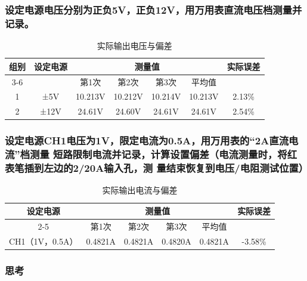 \documentclass[10.5pt]{config}
\begin{document}
\subsubsection{设定电源电压分别为正负5V，正负12V，用万用表直流电压档测量并记录。}
\begin{table}[htbp]
  \centering
  \caption{实际输出电压与偏差}
    \begin{tabular}{|c|c|c|c|c|c|c|}
    \hline
    \multirow{2}[4]{*}{组别} & \multirow{2}[4]{*}{设定电源} & \multicolumn{4}{c|}{测量值} & \multirow{2}[4]{*}{实际误差} \bigstrut\\
\cline{3-6}          &       & 第1次   & 第2次   & 第3次   & 平均值   &  \bigstrut\\
    \hline
    1     & ±5V   & 10.213V & 10.212V & 10.214V & 10.213V & 2.13\% \bigstrut\\
    \hline
    2     & ±12V  & 24.61V & 24.60V & 24.61V & 24.61V & 2.54\% \bigstrut\\
    \hline
    \end{tabular}%
  \label{tab:addlabel}%
\end{table}%

\subsubsection{设定电源CH1电压为1V，限定电流为0.5A，用万用表的“2A直流电流”档测量
短路限制电流并记录，计算设置偏差（电流测量时，将红表笔插到左边的2/20A输入孔，测
量结束恢复到电压/电阻测试位置）}

\begin{table}[H]
  \centering
  \caption{实际输出电流与偏差}
    \begin{tabular}{|c|c|c|c|c|c|}
    \hline
    \multirow{2}[4]{*}{设定电源} & \multicolumn{4}{c|}{测量值} & \multirow{2}[4]{*}{实际误差} \bigstrut\\
\cline{2-5}          & 第1次   & 第2次   & 第3次   & 平均值   &  \bigstrut\\
    \hline
    CH1（1V，0.5A） & 0.4821A & 0.4821A & 0.4820A & 0.4821A & -3.58\% \bigstrut\\
    \hline
    \end{tabular}%
  \label{tab:addlabel}%
\end{table}%

\subsubsection{思考}
\end{document}
